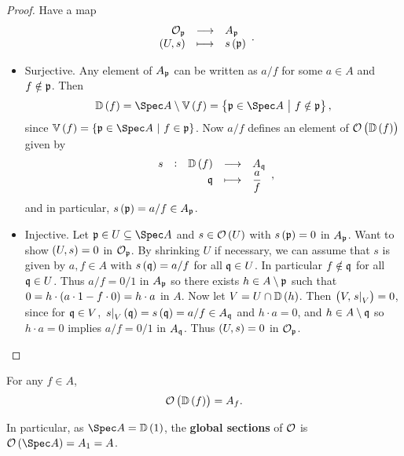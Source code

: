 \begin{proof}
Have a map
$$ \function{\OOO_\ppp}{A_\ppp}{\br{U, s}}{s\br{\ppp}}. $$
\begin{itemize}
\item Surjective. Any element of $ A_{\mathfrak{p}} $ can be written as $ a / f $ for some $ a \in A $ and $ f \notin \mathfrak{p} $. Then
$$ \DD\br{f} = \Spec A \setminus \VV\br{f} = \cbr{\ppp \in \Spec A \st f \notin \ppp}, $$
since $ \VV\br{f} = \cbr{\ppp \in \Spec A \st f \in \ppp} $. Now $ a / f $ defines an element of $ \OOO\br{\DD\br{f}} $ given by
$$ \function[s]{\DD\br{f}}{A_\qqq}{\qqq}{\dfrac{a}{f}}, $$
and in particular, $ s\br{\ppp} = a / f \in A_\ppp $.

\pagebreak

\item Injective. Let $ \ppp \in U \subseteq \Spec A $ and $ s \in \OOO\br{U} $ with $ s\br{\ppp} = 0 $ in $ A_{\mathfrak{p}} $. Want to show $ \br{U, s} = 0 $ in $ \mathcal{O}_{\mathfrak{p}} $. By shrinking $ U $ if necessary, we can assume that $ s $ is given by $ a, f \in A $ with $ s\br{\qqq} = a / f $ for all $ \mathfrak{q} \in U $. In particular $ f \notin \mathfrak{q} $ for all $ \mathfrak{q} \in U $. Thus $ a / f = 0 / 1 $ in $ A_{\mathfrak{p}} $ so there exists $ h \in A \setminus \mathfrak{p} $ such that $ 0 = h \cdot \br{a \cdot 1 - f \cdot 0} = h \cdot a $ in $ A $. Now let $ V = U \cap \DD\br{h} $. Then $ \br{V, \eval{s}_V} = 0 $, since for $ \mathfrak{q} \in V $, $ \eval{s}_V\br{\qqq} = s\br{\qqq} = a / f \in A_\qqq $ and $ h \cdot a = 0 $, and $ h \in A \setminus \mathfrak{q} $ so $ h \cdot a = 0 $ implies $ a / f = 0 / 1 $ in $ A_{\mathfrak{q}} $. Thus $ \br{U, s} = 0 $ in $ \mathcal{O}_{\mathfrak{p}} $.
\end{itemize}
\end{proof}

\begin{proposition}
For any $ f \in A $,
$$ \OOO\br{\DD\br{f}} = A_f. $$
\end{proposition}

In particular, as $ \Spec A = \DD\br{1} $, the \textbf{global sections} of $ \mathcal{O} $ is $ \OOO\br{\Spec A} = A_1 = A $.


